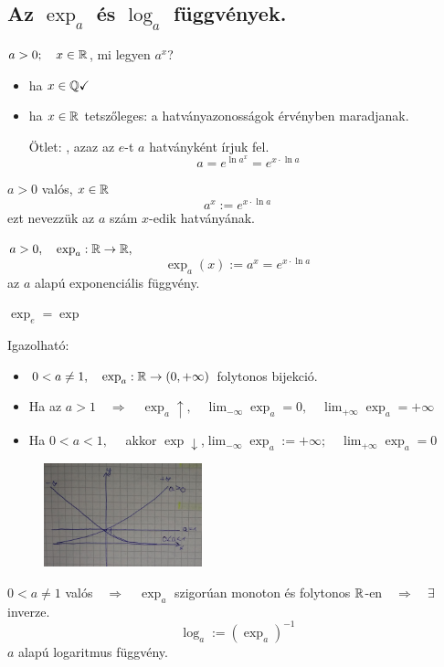 \documentclass[a4paper,11.5pt]{article}
\begin{document}
	\subsection{Az $\exp_a$ és $\log_a$ függvények.}
	\begin{note}
		$a>0; \quad x\in\mathbb{R}$, mi legyen $a^x$?
		\begin{itemize}
			\item ha $x\in\mathbb{Q}\checkmark$
			\item ha $x\in\mathbb{R}$ tetszőleges: a hatványazonosságok érvényben maradjanak.
			
			Ötlet: , azaz az $e$-t $a$ hatványként írjuk fel.
			\[ a=e^{\ln a ^x} = e^{x\cdot\ln a} \]
		\end{itemize}
	\end{note}
	\begin{definition}
		$a>0$ valós, $x\in\mathbb{R}$
		\[ a^x:=e^{x\cdot\ln a} \]
		ezt nevezzük az $a$ szám $x$-edik hatványának.
	\end{definition}
	\begin{definition}
		$a>0,\quad \exp_a:\mathbb{R}\to\mathbb{R},$
		\[ \exp_a(x):=a^x=e^{x\cdot\ln a} \]
		az $a$ alapú exponenciális függvény.
	\end{definition}
	\begin{note}
		$\exp_e=\exp$
		
		Igazolható:
		\begin{itemize}
			\item $0<a\not=1, \quad \exp_a:\mathbb{R}\to(0,+\infty)$ folytonos bijekció.
			\item Ha az $a>1\quad \Rightarrow\quad \exp_a\uparrow,\quad \lim_{-\infty}\exp_a=0,\quad \lim_{+\infty}\exp_a=+\infty$
			\item Ha $0<a<1,\quad $ akkor $\exp\downarrow$,\quad $\lim_{-\infty}\exp_a:=+\infty;\quad \lim_{+\infty}\exp_a=0$
		\end{itemize}
		
		\begin{figure}[H]
			\centering
			\includegraphics[height=3cm]{kepek/03ea_9.jpg}
			\caption{}\label{}
		\end{figure}
	\end{note}
	\begin{definition}
		$0<a\not=1$ valós$\quad \Rightarrow\quad \exp_a$ szigorúan monoton és folytonos $\mathbb{R}$-en$\quad \Rightarrow\quad \exists$ inverze.
		\[ \log_a:=\left(\exp_a\right)^{-1} \]
		$a$ alapú logaritmus függvény.
	\end{definition}
\end{document}
